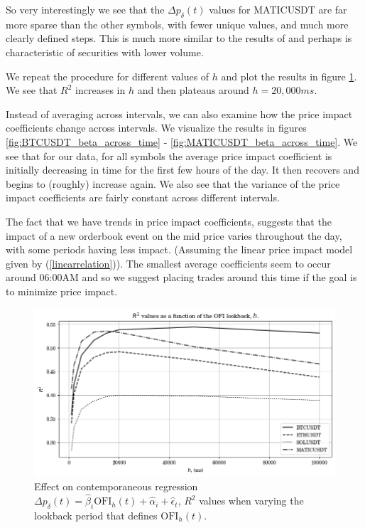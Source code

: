 \documentclass[a4paper, oneside, notitlepage]{book}
\begin{document}
So very interestingly we see that the $\Delta p_{\delta}(t)$ values for MATICUSDT
are far more sparse than the other symbols, with fewer unique values, and much more clearly
defined steps. This is much more similar to the results of \cite{CONT2013} and 
perhaps is characteristic of securities with lower volume.

We repeat the procedure for different values of $h$ and plot the results in figure \ref{r2_h}.
We see that $R^2$ increases in  $h$ and then plateaus around $h=20,000ms$.

Instead of averaging across intervals, we can also examine how the price impact coefficients change
across intervals. We visualize the results in figures \ref{fig:BTCUSDT_beta_across_time} - \ref{fig:MATICUSDT_beta_across_time}.
We see that for our data, for all symbols the average price impact coefficient is initially decreasing in time
for the first few hours of the day. It then recovers and begins to (roughly) increase again.
We also see that the variance of the price impact coefficients are fairly constant across different intervals.

The fact that we have trends in price impact coefficients, suggests that
the impact of a new orderbook event on the mid price varies throughout the day, with
some periods having less impact. (Assuming the linear price impact model given by (\ref{linearrelation})).
The smallest average coefficients seem to occur around 06:00AM and so we suggest placing trades around this time
if the goal is to minimize price impact.

\begin{figure}[htpb]
   \centering
   \includegraphics[width=1.0\textwidth]{./images/OFI_r2_h.png}
   \caption{Effect on contemporaneous regression $\Delta p_{\delta}(t) = \hat{\beta}_i \text{OFI}_h(t) + \hat{\alpha}_i + \hat{\epsilon}_t$,
       $R^2$ values when varying the lookback period that defines $\text{OFI}_h(t)$.
    }
   \label{r2_h}
\end{figure}
\end{document}
